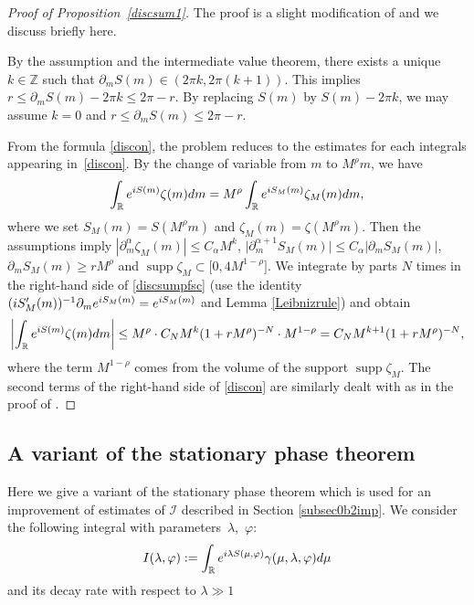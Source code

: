 \documentclass[10pt,a4paper]{article}
\numberwithin{equation}{section}
\def\R{\mathbb{R}}%
\DeclareMathOperator{\supp}{supp}%
\def\a{\alpha}
\def\c{\gamma}
\def\f{\varphi}
\def\l{\lambda}
\def\m{\mu}
\def\z{\zeta}
\def\pa{\partial}
\newcommand{\sI}{\mathscr{I}}
\begin{document}
\begin{proof}[Proof of Proposition~\ref{discsum1}]
The proof is a slight modification of \cite[Lemma 5.3]{IJ} and we discuss briefly here.

By the assumption and the intermediate value theorem, there exists a unique $k\in\mathbb{Z}$ such that $\pa_mS(m)\in (2\pi k,2\pi (k+1))$. This implies
$r\leq \pa_mS(m)-2\pi k\leq 2\pi -r$. By replacing $S(m)$ by $S(m)-2\pi k$, we may assume $k=0$ and $r\leq \pa_mS(m)\leq 2\pi -r$.

From the formula \eqref{discon}, the problem reduces to the estimates for each integrals appearing in~\eqref{discon}. By the change of variable from $m$ to $M^{\rho}m$, we have
\begin{align}\label{discsumpfsc}
\int_{\R}{\rm e}^{{\rm i}S(m)}\z(m){\rm d}m=M^{\rho}\int_{\R}{\rm e}^{{\rm i}S_M(m)}\z_M(m){\rm d}m,
\end{align}
where we set $S_M(m)\!=S(M^{\rho}m)$ and $\z_M(m)\!=\z(M^{\rho}m)$. Then the assumptions imply $|\pa_m^{\a}\z_M(m)|\allowbreak\leq C_{\a}M^k$, $\big|\pa_m^{\a+1}S_M(m)\big|\leq C_{\a}|\pa_mS_M(m)|$, $\pa_mS_M(m)\geq rM^{\rho}$ and $\supp \z_M\subset \bigl[0,4M^{1-\rho}\bigr]$. We integrate by parts $N$ times in the right-hand side of \eqref{discsumpfsc} (use the identity $({\rm i}S_M'(m))^{-1} \pa_m{\rm e}^{{\rm i}S_M(m)}={\rm e}^{{\rm i}S_M(m)} $ and Lemma \ref{Leibnizrule}) and obtain
\begin{align*}
\left|\int_{\R}{\rm e}^{{\rm i}S(m)}\z(m){\rm d}m\right|\leq M^{\rho}\cdot C_{N}M^k(1+rM^{\rho})^{-N}\cdot M^{1-\rho}=C_NM^{k+1}(1+rM^{\rho})^{-N},
\end{align*}
where the term $M^{1-\rho}$ comes from the volume of the support $\supp \z_M$. The second terms of the right-hand side of \eqref{discon} are similarly dealt with as in the proof of \cite[Lemma 5.3]{IJ}.
\end{proof}

\subsection{A variant of the stationary phase theorem}\label{subsecStphase}

Here we give a variant of the stationary phase theorem which is used for an improvement of estimates of $\sI$ described in Section \ref{subsec0b2imp}.
We consider the following integral with parameters~$\l$,~$\f$:
\begin{align*}
I(\l,\f):=\int_{\R}{\rm e}^{{\rm i}\l S(\m,\f)}\c(\m,\l,\f){\rm d}\m
\end{align*}
and its decay rate with respect to $\l\gg 1$
\end{document}
